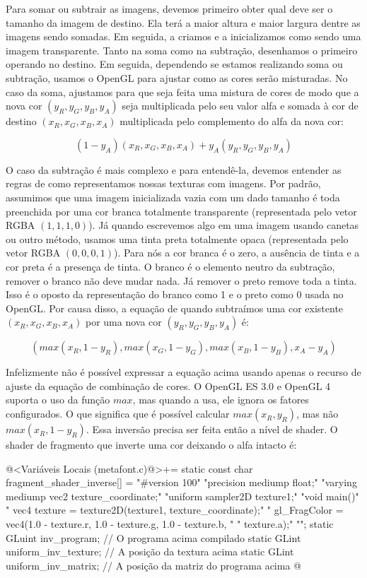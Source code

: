 {{{{{{Para somar ou subtrair as imagens, devemos primeiro obter qual deve
ser o tamanho da imagem de destino. Ela terá a maior altura e maior
largura dentre as imagens sendo somadas. Em seguida, a criamos e a
inicializamos como sendo uma imagem transparente. Tanto na soma como
na subtração, desenhamos o primeiro operando no destino. Em seguida,
dependendo se estamos realizando soma ou subtração, usamos o OpenGL
para ajustar como as cores serão misturadas. No caso da soma,
ajustamos para que seja feita uma mistura de cores de modo que a nova
cor $(y_R, y_G, y_B, y_A)$ seja multiplicada pelo seu valor alfa e
somada à cor de destino $(x_R, x_G, x_B, x_A)$ multiplicada pelo
complemento do alfa da nova cor:

$$(1-y_A)(x_R, x_G, x_B, x_A) + y_A(y_R, y_G, y_B, y_A)$$

O caso da subtração é mais complexo e para entendê-la, devemos
entender as regras de como representamos nossas texturas com
imagens. Por padrão, assumimos que uma imagem inicializada vazia com
um dado tamanho é toda preenchida por uma cor branca totalmente
transparente (representada pelo vetor RGBA $(1, 1, 1, 0)$). Já quando
escrevemos algo em uma imagem usando canetas ou outro método, usamos
uma tinta preta totalmente opaca (representada pelo vetor RGBA $(0, 0,
0, 1)$). Para nós a cor branca é o zero, a ausência de tinta e a cor
preta é a presença de tinta. O branco é o elemento neutro da
subtração, remover o branco não deve mudar nada. Já remover o preto
remove toda a tinta. Isso é o oposto da representação do branco como 1
e o preto como 0 usada no OpenGL. Por causa disso, a equação de quando
subtraímos uma cor existente $(x_R, x_G, x_B, x_A)$ por uma nova cor
$(y_R, y_G, y_B, y_A)$ é:

$$
(max(x_R, 1-y_R), max(x_G, 1-y_G), max(x_B, 1-y_B), x_A-y_A)
$$

Infelizmente não é possível expressar a equação acima usando apenas o
recurso de ajuste da equação de combinação de cores. O OpenGL ES 3.0 e
OpenGL 4 suporta o uso da função $max$, mas quando a usa, ele ignora
os fatores configurados. O que significa que é possível calcular
$max(x_R, y_R)$, mas não $max(x_R, 1- y_R)$. Essa inversão precisa ser
feita então a nível de shader. O shader de fragmento que inverte uma
cor deixando o alfa intacto é:

\iniciocodigo
@<Variáveis Locais (metafont.c)@>+=
static const char fragment_shader_inverse[] =
  "#version 100\n"
  "precision mediump float;\n"
  "varying mediump vec2 texture_coordinate;\n"
  "uniform sampler2D texture1;\n"
  "void main(){\n"
  "  vec4 texture = texture2D(texture1, texture_coordinate);\n"
  "  gl_FragColor = vec4(1.0 - texture.r, 1.0 - texture.g, 1.0 - texture.b, \n"
  "                      texture.a);\n"
  "}\n";
static GLuint inv_program; // O programa acima compilado
static GLint uniform_inv_texture; // A posição da textura acima
static GLint uniform_inv_matrix; // A posição da matriz do programa acima
@
\fimcodigo

}}}}}}
